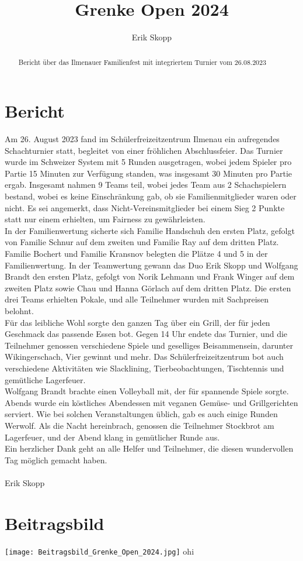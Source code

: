 \documentclass[a4paper,ngerman]{tui-algo-seminar}
\title{Grenke Open 2024}
\author{Erik Skopp}
\begin{document}
\maketitle

\begin{abstract}
Bericht über das Ilmenauer Familienfest mit integriertem Turnier vom 26.08.2023
\end{abstract}

\section{Bericht}
Am 26. August 2023 fand im Schülerfreizeitzentrum Ilmenau ein aufregendes Schachturnier statt, begleitet von einer fröhlichen Abschlussfeier. Das Turnier wurde im Schweizer System mit 5 Runden ausgetragen, wobei jedem Spieler pro Partie 15 Minuten zur Verfügung standen, was insgesamt 30 Minuten pro Partie ergab. Insgesamt nahmen 9 Teams teil, wobei jedes Team aus 2 Schachspielern bestand, wobei es keine Einschränkung gab, ob sie Familienmitglieder waren oder nicht. Es sei angemerkt, dass Nicht-Vereinsmitglieder bei einem Sieg 2 Punkte statt nur einem erhielten, um Fairness zu gewährleisten.\\
In der Familienwertung sicherte sich Familie Handschuh den ersten Platz, gefolgt von Familie Schnur auf dem zweiten und Familie Ray auf dem dritten Platz. Familie Bochert und Familie Kransnov belegten die Plätze 4 und 5 in der Familienwertung. In der Teamwertung gewann das Duo Erik Skopp und Wolfgang Brandt den ersten Platz, gefolgt von Norik Lehmann und Frank Winger auf dem zweiten Platz sowie Chau und Hanna Görlach auf dem dritten Platz. Die ersten drei Teams erhielten Pokale, und alle Teilnehmer wurden mit Sachpreisen belohnt.\\
Für das leibliche Wohl sorgte den ganzen Tag über ein Grill, der für jeden Geschmack das passende Essen bot. Gegen 14 Uhr endete das Turnier, und die Teilnehmer genossen verschiedene Spiele und geselliges Beisammensein, darunter Wikingerschach, Vier gewinnt und mehr. Das Schülerfreizeitzentrum bot auch verschiedene Aktivitäten wie Slacklining, Tierbeobachtungen, Tischtennis und gemütliche Lagerfeuer.\\
Wolfgang Brandt brachte einen Volleyball mit, der für spannende Spiele sorgte. Abends wurde ein köstliches Abendessen mit veganen Gemüse- und Grillgerichten serviert. Wie bei solchen Veranstaltungen üblich, gab es auch einige Runden Werwolf. Als die Nacht hereinbrach, genossen die Teilnehmer Stockbrot am Lagerfeuer, und der Abend klang in gemütlicher Runde aus.\\
Ein herzlicher Dank geht an alle Helfer und Teilnehmer, die diesen wundervollen Tag möglich gemacht haben.\\ 
\\
Erik Skopp

\section{Beitragsbild}
\begin{center}
\texttt{[image: Beitragsbild\_Grenke\_Open\_2024.jpg]} 
\label{fig:ohnefloat}
ohi
\end{center}
\end{document}
